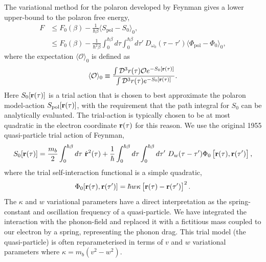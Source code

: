 The variational method for the polaron developed by Feynman gives a lower upper-bound to the polaron free energy, 
\begin{equation}\label{eqn:general-feynman-jensen}
    \begin{aligned}
         F &\leq F_0(\beta) - \frac{1}{\hbar\beta} \langle S_{\text{pol}} - S_{0} \rangle_0 , \\
         &\leq F_0(\beta) -\frac{1}{\hbar^2\beta} \int_0^{\hbar\beta} d\tau \int_0^{\hbar\beta} d\tau'\ D_{\omega_0}(\tau - \tau') \langle \Phi_{\text{pol}} - \Phi_0 \rangle_0 ,
    \end{aligned}
\end{equation}
where the expectation $\langle \mathcal{O} \rangle_0$ is defined as 
\begin{equation}
    \langle \mathcal{O} \rangle_0 \equiv \frac{\int \mathcal{D}^3 r(\tau)
    \mathcal{O} e^{-S_0[\vb{r}(\tau)]}}{\int \mathcal{D}^3 r(\tau)
    e^{-S_0[\vb{r}(\tau)]}}. 
\end{equation}
Here $S_0[\vb{r}(\tau)]$ is a trial action that is chosen to best approximate
the polaron model-action $S_{\text{pol}}[\vb{r}(\tau)]$, with the requirement
that the path integral for $S_0$ can be analytically evaluated.  
The trial-action is typically chosen to be at most quadratic in the electron
coordinate $\vb{r}(\tau)$ for this reason. 
We use the original 1955 quasi-particle trial action of Feynman, 
\begin{equation}
    S_{0}[\vb{r}(\tau)] = \frac{m_b}{2} \int_0^{\hbar\beta} d\tau\ \Dot{\vb{r}}^2(\tau) + \frac{1}{\hbar} \int_0^{\hbar\beta} d\tau \int_0^{\hbar\beta} d\tau'\ D_{w}(\tau - \tau') \Phi_0\left[\vb{r}(\tau), \vb{r}(\tau')\right] ,
\end{equation}
where the trial self-interaction functional is a simple quadratic,
\begin{equation}
    \Phi_0[\vb{r}(\tau), \vb{r}(\tau')] = \hbar w \kappa \left[\vb{r}(\tau) - \vb{r}(\tau')\right]^2 .
\end{equation}
The $\kappa$ and $w$ variational parameters have a direct interpretation as the
spring-constant and oscillation frequency of a quasi-particle. 
We have integrated the interaction with the phonon-field and replaced it
with a fictitious mass coupled to our electron by a spring, representing the
phonon drag. 
This trial model (the quasi-particle) is often reparameterised in terms of $v$
and $w$ variational parameters where $\kappa = m_b (v^2 - w^2)$. 

